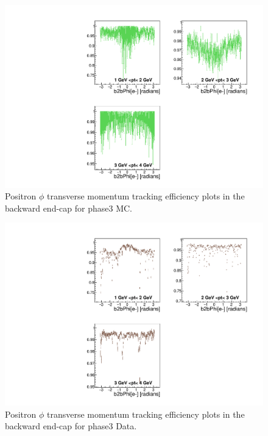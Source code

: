 \documentclass[a4paper,11pt,twosided,final,german,openbib,pdftex,listof=totoc,bibliography=totoc]{scrbook}
\begin{document}
\begin{appendix}


\clearpage



\begin{figure}[!htbp]
	\centering
	\includegraphics[width=\textwidth]{Plots/master3/xPtMPhiepEC_MCP3}
	\caption[Transverse Momentum $\phi$ Positron Backward End-Cap Efficiency Phase3 MC]{Positron $\phi$ transverse momentum tracking efficiency plots in the backward end-cap for phase3 MC.}
	\label{plt:PtMPhiepEC3_MC}
\end{figure}


\begin{figure}[!htbp]
	\centering
	\includegraphics[width=\textwidth]{Plots/master3/xPtMPhiepEC_DataP3}
	\caption[Transverse Momentum $\phi$ Positron Backward End-Cap Efficiency Phase3 Data]{Positron $\phi$ transverse momentum tracking efficiency plots in the backward end-cap for phase3 Data.}
	\label{plt:PtMPhiepEC3_Data}
\end{figure}



\end{appendix}
\end{document}
